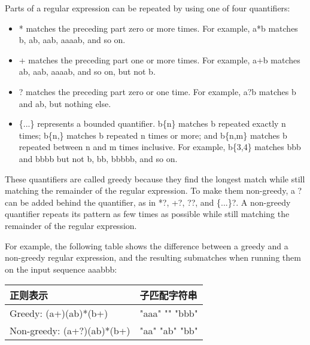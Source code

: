 
Parts of a regular expression can be repeated by using one of four quantifiers:

\begin{itemize}
\item
* matches the preceding part zero or more times. For example, a*b matches b, ab, aab, aaaab, and so on.

\item
+ matches the preceding part one or more times. For example, a+b matches ab, aab, aaaab, and so on, but not b.

\item
? matches the preceding part zero or one time. For example, a?b matches b and ab, but nothing else.

\item
\{...\} represents a bounded quantifier. b\{n\} matches b repeated exactly n times; b\{n,\} matches b repeated n times or more; and b\{n,m\} matches b repeated between n and m times inclusive. For example, b\{3,4\} matches bbb and bbbb but not b, bb, bbbbb, and so on.
\end{itemize}

These quantifiers are called greedy because they find the longest match while still matching the remainder of the regular expression. To make them non-greedy, a ? can be added behind the quantifier, as in *?, +?, ??, and \{...\}?. A non-greedy quantifier repeats its pattern as few times as possible while still matching the remainder of the regular expression.

For example, the following table shows the difference between a greedy and a non-greedy regular expression, and the resulting submatches when running them on the input sequence aaabbb:

\begin{longtable}{|l|l|}
\hline
\textbf{正则表示} & \textbf{子匹配字符串} \\ \hline
\endfirsthead
%
\endhead
%
Greedy: (a+)(ab)*(b+)       & "aaa" "" "bbb"      \\ \hline
Non-greedy: (a+?)(ab)*(b+)  & "aa" "ab" "bb"      \\ \hline
\end{longtable}


